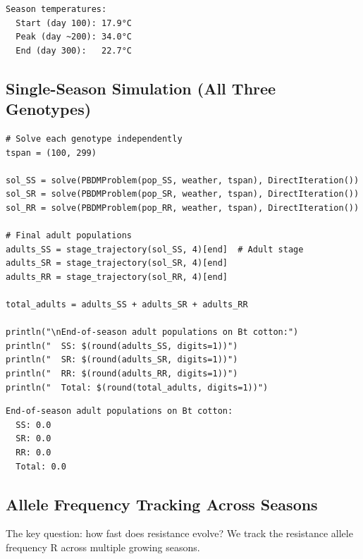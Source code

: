 \begin{verbatim}
Season temperatures:
  Start (day 100): 17.9°C
  Peak (day ~200): 34.0°C
  End (day 300):   22.7°C
\end{verbatim}



\subsection{Single-Season Simulation (All Three Genotypes)}



\label{11786944533291261386}{}



\begin{verbatim}
# Solve each genotype independently
tspan = (100, 299)

sol_SS = solve(PBDMProblem(pop_SS, weather, tspan), DirectIteration())
sol_SR = solve(PBDMProblem(pop_SR, weather, tspan), DirectIteration())
sol_RR = solve(PBDMProblem(pop_RR, weather, tspan), DirectIteration())

# Final adult populations
adults_SS = stage_trajectory(sol_SS, 4)[end]  # Adult stage
adults_SR = stage_trajectory(sol_SR, 4)[end]
adults_RR = stage_trajectory(sol_RR, 4)[end]

total_adults = adults_SS + adults_SR + adults_RR

println("\nEnd-of-season adult populations on Bt cotton:")
println("  SS: $(round(adults_SS, digits=1))")
println("  SR: $(round(adults_SR, digits=1))")
println("  RR: $(round(adults_RR, digits=1))")
println("  Total: $(round(total_adults, digits=1))")
\end{verbatim}




\begin{verbatim}
End-of-season adult populations on Bt cotton:
  SS: 0.0
  SR: 0.0
  RR: 0.0
  Total: 0.0
\end{verbatim}



\subsection{Allele Frequency Tracking Across Seasons}



\label{14734690395295992852}{}


The key question: how fast does resistance evolve? We track the resistance allele frequency R across multiple growing seasons.





